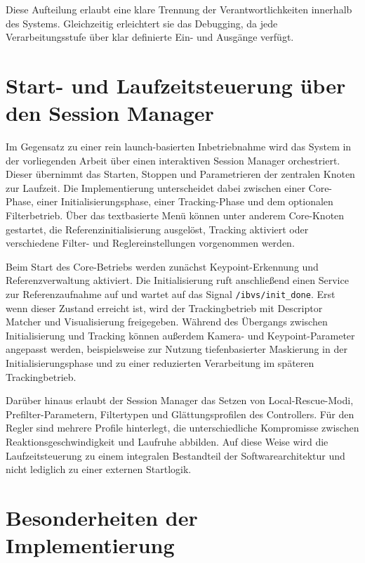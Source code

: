 Diese Aufteilung erlaubt eine klare Trennung der Verantwortlichkeiten innerhalb des Systems. Gleichzeitig erleichtert sie das Debugging, da jede Verarbeitungsstufe über klar definierte Ein- und Ausgänge verfügt.

\section{Start- und Laufzeitsteuerung über den Session Manager}
\label{sec:start_laufzeitsteuerung_session_manager}

Im Gegensatz zu einer rein launch-basierten Inbetriebnahme wird das System in der vorliegenden Arbeit über einen interaktiven Session Manager orchestriert. Dieser übernimmt das Starten, Stoppen und Parametrieren der zentralen Knoten zur Laufzeit. Die Implementierung unterscheidet dabei zwischen einer Core-Phase, einer Initialisierungsphase, einer Tracking-Phase und dem optionalen Filterbetrieb. Über das textbasierte Menü können unter anderem Core-Knoten gestartet, die Referenzinitialisierung ausgelöst, Tracking aktiviert oder verschiedene Filter- und Reglereinstellungen vorgenommen werden. 

Beim Start des Core-Betriebs werden zunächst Keypoint-Erkennung und Referenzverwaltung aktiviert. Die Initialisierung ruft anschließend einen Service zur Referenzaufnahme auf und wartet auf das Signal \texttt{/ibvs/init\_done}. Erst wenn dieser Zustand erreicht ist, wird der Trackingbetrieb mit Descriptor Matcher und Visualisierung freigegeben. Während des Übergangs zwischen Initialisierung und Tracking können außerdem Kamera- und Keypoint-Parameter angepasst werden, beispielsweise zur Nutzung tiefenbasierter Maskierung in der Initialisierungsphase und zu einer reduzierten Verarbeitung im späteren Trackingbetrieb. 

Darüber hinaus erlaubt der Session Manager das Setzen von Local-Rescue-Modi, Prefilter-Parametern, Filtertypen und Glättungsprofilen des Controllers. Für den Regler sind mehrere Profile hinterlegt, die unterschiedliche Kompromisse zwischen Reaktionsgeschwindigkeit und Laufruhe abbilden. Auf diese Weise wird die Laufzeitsteuerung zu einem integralen Bestandteil der Softwarearchitektur und nicht lediglich zu einer externen Startlogik. 

\section{Besonderheiten der Implementierung}
\label{sec:besonderheiten_implementierung}

